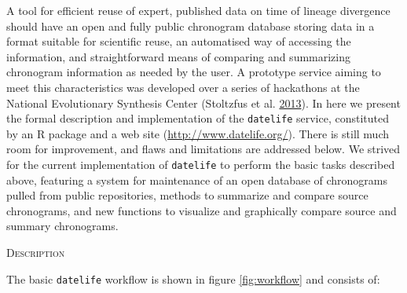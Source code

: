 \documentclass[]{article}
\begin{document}
A tool for efficient reuse of expert, published data on time of lineage divergence should have an open and fully public chronogram database storing data in a format suitable for scientific reuse, an automatised way of accessing the information, and straightforward means of comparing and summarizing chronogram information as needed by the user.
A prototype service aiming to meet this characteristics was developed over a series of hackathons at the National Evolutionary Synthesis Center (Stoltzfus et al. \protect\hyperlink{ref-Stoltzfus2013}{2013}).
In here we present the formal description and implementation of the \texttt{datelife} service, constituted by an R package and a web site (\url{http://www.datelife.org/}). There is still much room for improvement, and flaws and limitations are addressed below. We strived for the current implementation of \texttt{datelife} to perform the basic tasks described above, featuring a system for maintenance of an open database of chronograms pulled from public repositories, methods to summarize and compare source chronograms, and new functions to visualize and graphically compare source and summary chronograms.

\begin{center}
\textsc{Description}
\end{center}

The basic \texttt{datelife} workflow is shown in figure \ref{fig:workflow} and consists of:
\end{document}
